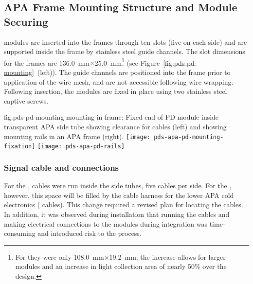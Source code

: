 \subsection{APA Frame Mounting Structure and Module Securing}	
\label{sec:fdsp-pd-assy-frames}

 modules are inserted into the  frames through ten slots (five on each side) and are supported inside the frame by stainless steel guide channels.  The slot dimensions for the   frames 
are \SI{136.0}{mm}$\times$\SI{25.0}{mm}\footnote{For  they were only \SI{108.0}{mm}$\times$\SI{19.2}{mm}; the increase allows for larger  modules and an increase in light collection area of nearly 50\% over the  design.}   
(see Figure~\ref{fig:pds-pd-mounting}~(left)).
The guide channels are positioned into the  frame prior to application of the wire %
mesh, %
and are not accessible following wire wrapping. Following insertion, the  modules are fixed in place using two stainless steel captive screws.

 

\begin{dunefigure}{fig:pds-pd-mounting}
{ mounting in  frame: Fixed end of PD module inside transparent APA side tube showing clearance for  cables (left) and showing  mounting rails in an APA frame  (right).}
	\texttt{[image: pds-apa-pd-mounting-fixation]}
	\texttt{[image: pds-apa-pd-rails]}
\end{dunefigure}

\subsubsection{Signal cable and connections}

For the ,  cables were run inside the  side tubes, five cables per side.  For the , however, this space will be filled by the cable harness for the lower APA cold electronics ( cables).  This change required a revised plan for locating the  cables.  In addition, it was observed during   installation that running the  cables and making electrical connections to the modules during  integration was time-consuming and introduced risk to the process.

